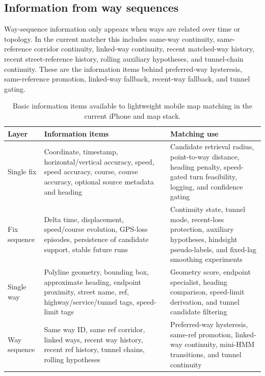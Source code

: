 \documentclass{article}
\begin{document}
\subsection{Information from way sequences}
Way-sequence information only appears when ways are related over time or topology. In the current matcher this includes same-way continuity, same-reference corridor continuity, linked-way continuity, recent matched-way history, recent street-reference history, rolling auxiliary hypotheses, and tunnel-chain continuity. These are the information items behind preferred-way hysteresis, same-reference promotion, linked-way fallback, recent-way fallback, and tunnel gating.

\begin{table}[!htbp]
\centering
\caption{Basic information items available to lightweight mobile map matching in the current iPhone and map stack.}
\label{tab:information_items}
\footnotesize
\setlength{\tabcolsep}{4pt}
\renewcommand{\arraystretch}{1.06}
\begin{tabular}{>{\raggedright\arraybackslash}p{2.1cm}>{\raggedright\arraybackslash}p{5.0cm}>{\raggedright\arraybackslash}p{5.9cm}}
\toprule
Layer & Information items & Matching use \\
\midrule
Single fix & Coordinate, timestamp, horizontal/vertical accuracy, speed, speed accuracy, course, course accuracy, optional source metadata and heading & Candidate retrieval radius, point-to-way distance, heading penalty, speed-gated turn feasibility, logging, and confidence gating \\
Fix sequence & Delta time, displacement, speed/course evolution, GPS-loss episodes, persistence of candidate support, stable future runs & Continuity state, tunnel mode, recent-loss protection, auxiliary hypotheses, hindsight pseudo-labels, and fixed-lag smoothing experiments \\
Single way & Polyline geometry, bounding box, approximate heading, endpoint proximity, street name, ref, highway/service/tunnel tags, speed-limit tags & Geometry score, endpoint specialist, heading comparison, speed-limit derivation, and tunnel candidate filtering \\
Way sequence & Same way ID, same ref corridor, linked ways, recent way history, recent ref history, tunnel chains, rolling hypotheses & Preferred-way hysteresis, same-ref promotion, linked-way continuity, mini-HMM transitions, and tunnel continuity \\
\bottomrule
\end{tabular}
\end{table}
\end{document}
